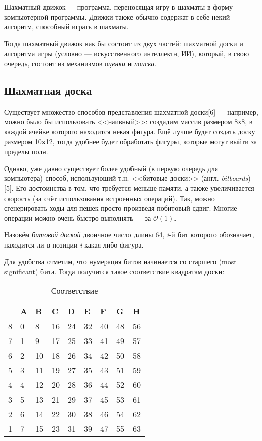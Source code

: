 {	Шахматный движок --- программа, переносящая игру в шахматы в форму компьютерной программы. Движки также обычно содержат в себе некий алгоритм, способный играть в шахматы.
	
	Тогда шахматный движок как бы состоит из двух частей: шахматной доски и алгоритма игры (условно --- искусственного интеллекта, ИИ), который, в свою очередь, состоит из механизмов \textit{оценки} и \textit{поиска}.
	
	\subsection{Шахматная доска}
	
	Существует множество способов представления шахматной доски[6] --- например, можно было бы использовать <<наивный>>: создадим массив размером 8х8, в каждой ячейке которого находится некая фигура. Ещё лучше будет создать доску размером 10х12, тогда удобнее будет обработать фигуры, которые могут выйти за пределы поля.
	
	Однако, уже давно существует более удобный (в первую очередь для компьютера) способ, использующий т.н. <<битовые доски>> (англ. \textit{bitboards})[5]. Его достоинства в том, что требуется меньше памяти, а также увеличивается скорость (за счёт использования встроенных операций). Так, можно сгенерировать ходы для пешек просто произведя побитовый сдвиг. Многие операции можно очень быстро выполнять --- за $\mathcal{O}(1)$.
	
	Назовём \textit{битовой доской} двоичное число длины 64, \textit{i}-й бит которого обозначает, находится ли в позиции \textit{i} какая-либо фигура.
	
	Для удобства отметим, что нумерация битов начинается со старшего (most significant) бита. Тогда получится такое соответствие квадратам доски:
	
	
	
	\begin{table}[h]
		\centering
		\caption{Соответствие}
		\label{tab: accord}
		\begin{tabular}{|l|l|l|l|l|l|l|l|l|}
			\hline
			  & A & B  & C  & D  & E  & F  & G  & H  \\ \hline
			8 & 0 & 8  & 16 & 24 & 32 & 40 & 48 & 56 \\ \hline
			7 & 1 & 9  & 17 & 25 & 33 & 41 & 49 & 57 \\ \hline
			6 & 2 & 10 & 18 & 26 & 34 & 42 & 50 & 58 \\ \hline
			5 & 3 & 11 & 19 & 27 & 35 & 43 & 51 & 59 \\ \hline
			4 & 4 & 12 & 20 & 28 & 36 & 44 & 52 & 60 \\ \hline
			3 & 5 & 13 & 21 & 29 & 37 & 45 & 53 & 61 \\ \hline
			2 & 6 & 14 & 22 & 30 & 38 & 46 & 54 & 62 \\ \hline
			1 & 7 & 15 & 23 & 31 & 39 & 47 & 55 & 63 \\ \hline
		\end{tabular}
	\end{table}
	
}
